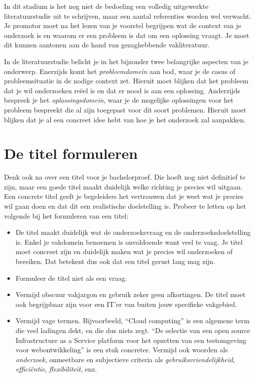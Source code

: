 In dit stadium is het nog niet de bedoeling een volledig uitgewerkte literatuurstudie uit te schrijven, maar een aantal referenties worden wel verwacht. Je promotor moet na het lezen van je voorstel begrijpen wat de context van je onderzoek is en waarom er een probleem is dat om een oplossing vraagt. Je moet dit kunnen aantonen aan de hand van gezaghebbende vakliteratuur.

In de literatuurstudie belicht je in het bijzonder twee belangrijke aspecten van je onderwerp. Enerzijds komt het \emph{probleemdomein} aan bod, waar je de casus of probleemsituatie in de nodige context zet. Hieruit moet blijken dat het probleem dat je wil onderzoeken reëel is en dat er nood is aan een oplossing. Anderzijds bespreek je het \emph{oplossingsdomein}, waar je de mogelijke oplossingen voor het probleem bespreekt die al zijn toegepast voor dit soort problemen. Hieruit moet blijken dat je al een concreet idee hebt van hoe je het onderzoek zal aanpakken.

\section{De titel formuleren}%
\label{sec:onderwerp_titel}

Denk ook na over een titel voor je bachelorproef. Die hoeft nog niet definitief te zijn, maar een goede titel maakt duidelijk welke richting je precies wil uitgaan. Een concrete titel geeft je begeleiders het vertrouwen dat je weet wat je precies wil gaan doen en dat dit een realistische doelstelling is. Probeer te letten op het volgende bij het formuleren van een titel:

\begin{itemize}
  \item De titel maakt duidelijk wat de onderzoeksvraag en de onderzoeksdoelstelling is. Enkel je vakdomein benoemen is onvoldoende want veel te vaag. Je titel moet concreet zijn en duidelijk maken wat je precies wil onderzoeken of bereiken. Dat betekent dus ook dat een titel gerust lang mag zijn.
  \item Formuleer de titel niet als een vraag.
  \item Vermijd obscuur vakjargon en gebruik zeker geen afkortingen. De titel moet ook begrijpbaar zijn voor een IT'er van buiten jouw specifieke vakgebied.
  \item Vermijd vage termen. Bijvoorbeeld, ``Cloud computing'' is een algemene term die veel ladingen dekt, en die dus niets zegt. ``De selectie van een open source Infrastructure as a Service platform voor het opzetten van een testomgeving voor webontwikkeling'' is een stuk concreter. Vermijd ook woorden als \emph{onderzoek}, onmeetbare en subjectieve criteria als \emph{gebruiksvriendelijkheid}, \emph{efficiëntie}, \emph{flexibiliteit}, enz.
\end{itemize}

